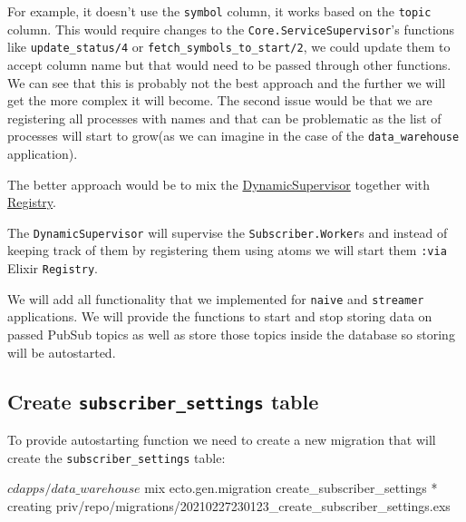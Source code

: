 \documentclass[
  oneside]{book}
\newenvironment{Shaded}{\begin{snugshade}}{\end{snugshade}}
\newcommand{\ExtensionTok}[1]{#1}
\newcommand{\NormalTok}[1]{#1}
\begin{document}
For example, it doesn't use the \texttt{symbol} column, it works based on the \texttt{topic} column. This would require changes to the \texttt{Core.ServiceSupervisor}'s functions like \texttt{update\_status/4} or \texttt{fetch\_symbols\_to\_start/2}, we could update them to accept column name but that would need to be passed through other functions. We can see that this is probably not the best approach and the further we will get the more complex it will become. The second issue would be that we are registering all processes with names and that can be problematic as the list of processes will start to grow(as we can imagine in the case of the \texttt{data\_warehouse} application).

The better approach would be to mix the \href{https://hexdocs.pm/elixir/master/DynamicSupervisor.html}{DynamicSupervisor} together with \href{https://hexdocs.pm/elixir/master/Registry.html}{Registry}.

The \texttt{DynamicSupervisor} will supervise the \texttt{Subscriber.Worker}s and instead of keeping track of them by registering them using atoms we will start them \texttt{:via} Elixir \texttt{Registry}.

We will add all functionality that we implemented for \texttt{naive} and \texttt{streamer} applications. We will provide the functions to start and stop storing data on passed PubSub topics as well as store those topics inside the database so storing will be autostarted.

\hypertarget{create-subscriber_settings-table}{%
\subsection{\texorpdfstring{Create \texttt{subscriber\_settings} table}{Create subscriber\_settings table}}\label{create-subscriber_settings-table}}

To provide autostarting function we need to create a new migration that will create the \texttt{subscriber\_settings} table:

\begin{Shaded}
\begin{Highlighting}[]
\ExtensionTok{$}\NormalTok{ cd apps/data\_warehouse}
\ExtensionTok{$}\NormalTok{ mix ecto.gen.migration create\_subscriber\_settings}
\ExtensionTok{*}\NormalTok{ creating priv/repo/migrations/20210227230123\_create\_subscriber\_settings.exs}
\end{Highlighting}
\end{Shaded}
\end{document}

